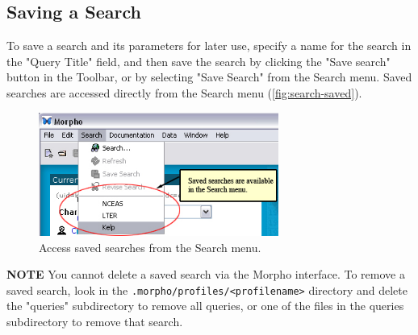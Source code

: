 \subsection{Saving a Search}

To save a search and its parameters for later use, specify a name for
the search in the "Query Title" field, and then save the search by
clicking the "Save search" button in the Toolbar, or by selecting "Save
Search" from the Search menu. Saved searches are accessed directly from
the Search menu (\autoref{fig:search-saved}).

\begin{figure}
  \centering
    \includegraphics[width=0.7\textwidth]{images/search-saved.jpg}
  \caption{Access saved searches from the Search menu.}
  \label{fig:search-saved}
\end{figure}

\begin{shaded}
  \textbf{NOTE} You cannot delete a saved search via the Morpho
  interface. To remove a saved search, look in the
  \texttt{.morpho/profiles/<profilename>} directory and delete the
  "queries" subdirectory to remove all queries, or one of the files in
  the queries subdirectory to remove that search.
\end{shaded}

